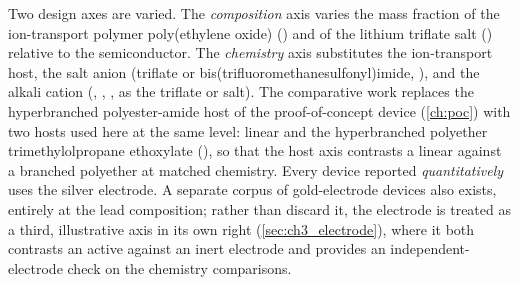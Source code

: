 \documentclass[12pt, twoside]{report}
\begin{document}
Two design axes are varied. The \emph{composition} axis varies the mass fraction of the ion-transport polymer poly(ethylene oxide) (\PEO{}) and of the lithium triflate salt (\LiTf{}) relative to the semiconductor. The \emph{chemistry} axis substitutes the ion-transport host, the salt anion (triflate or bis(trifluoromethanesulfonyl)imide, \TFSI{}), and the alkali cation (, , , as the triflate or \TFSI{} salt). The comparative work replaces the hyperbranched polyester-amide \Hybrane{} host of the proof-of-concept device (\cref{ch:poc}) with two hosts used here at the same level: linear \PEO{} and the hyperbranched polyether trimethylolpropane ethoxylate (\TMPE{}), so that the host axis contrasts a linear against a branched polyether at matched chemistry. Every device reported \emph{quantitatively} uses the silver electrode. A separate corpus of gold-electrode devices also exists, entirely at the lead composition; rather than discard it, the electrode is treated as a third, illustrative axis in its own right (\cref{sec:ch3_electrode}), where it both contrasts an active against an inert electrode and provides an independent-electrode check on the chemistry comparisons.
\end{document}
